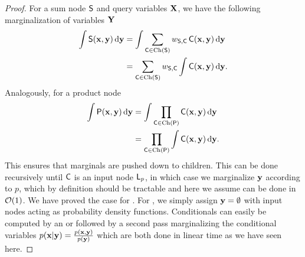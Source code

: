 \linevi*
\begin{proof}
  \label{proof:linevi}
  For a sum node $\Sum$ and query variables $\set{X}$, we have the following marginalization of
  variables $\set{Y}$
  \begin{align*}
    \int\Sum(\set{x},\set{y})\dif\set{y}&=\int\sum_{\Child\in\Ch(\Sum)}w_{\Sum,\Child}\Child(\set{x},\set{y})\dif\set{y}\\
                                        &=\sum_{\Child\in\Ch(\Sum)}w_{\Sum,\Child}\int\Child(\set{x},\set{y})\dif\set{y}.
  \end{align*}
  Analogously, for a product node
  \begin{align*}
    \int\Prod(\set{x},\set{y})\dif\set{y}&=\int\prod_{\Child\in\Ch(\Prod)}\Child(\set{x},\set{y})\dif\set{y}\\
                                         &=\prod_{\Child\in\Ch(\Prod)}\int\Child(\set{x},\set{y})\dif\set{y}.
  \end{align*}
  This ensures that marginals are pushed down to children. This can be done recursively until
  $\Child$ is an input node $\Leaf_p$, in which case we marginalize $\set{y}$ according to $p$,
  which by definition should be tractable and here we assume can be done in $\bigo(1)$. We have
  proved the case for \mar{}. For \evi{}, we simply assign $\set{y}=\emptyset$ with input nodes
  acting as probability density functions. Conditionals can easily be computed by an \evi{} or
  \mar{} followed by a second pass marginalizing the conditional variables
  $p(\set{x}|\set{y})=\frac{p(\set{x},\set{y})}{p(\set{y})}$ which are both done in linear time as
  we have seen here.
\end{proof}

